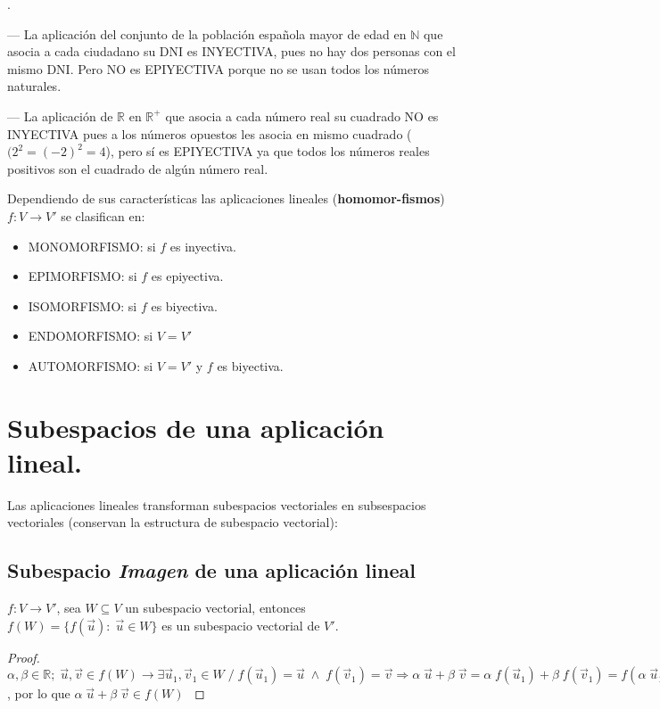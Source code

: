 \begin{ejem}.

--- La aplicación del conjunto de la población española mayor de edad en $\mathbb N$ que asocia a cada ciudadano su DNI es INYECTIVA, pues no hay dos personas con el mismo DNI. Pero NO es EPIYECTIVA	porque no se usan todos los números naturales.

--- La aplicación de $\mathbb R$ en $\mathbb R^+$ que asocia a cada número real su cuadrado NO es INYECTIVA pues a los números opuestos les asocia en mismo cuadrado ($(2^2=(-2)^2=4$), pero sí es EPIYECTIVA ya que todos los números reales positivos son el cuadrado de algún número real.
\end{ejem}

\justify

Dependiendo de sus características las aplicaciones lineales (\textbf{homomor-fismos}) $f:V\to V'$ se clasifican en:

\begin{itemize}
\item MONOMORFISMO: si $f$ es inyectiva.
\item EPIMORFISMO: si $f$ es epiyectiva.
\item ISOMORFISMO: si $f$ es biyectiva.
\item ENDOMORFISMO: si $V=V'$
\item AUTOMORFISMO: si $V=V'$ y $f$ es biyectiva.
\end{itemize}

\section{Subespacios de una aplicación lineal.}

Las aplicaciones lineales transforman subespacios vectoriales en subsespacios vectoriales (conservan la estructura de subespacio vectorial):

\subsection{Subespacio \emph{Imagen} de una aplicación lineal}

\begin{prop}
$f:V\to V'$, sea $W \subseteq V$ un subespacio vectorial, entonces $f(W)=\{f(\vec u): \; \vec u\in W \}$	 es un subespacio vectorial de $V'$.
\end{prop}
\begin{proof}
\textcolor{gris}{ $\alpha, \beta \in \mathbb R; \; \vec u, \vec v \in f(W) \to \exists \vec u_1, \vec v_1 \in W \; / \; f(\vec u_1)=\vec u\; \wedge \; f(\vec v_1)=\vec v \Rightarrow \alpha\; \vec u + \beta\; \vec v = \alpha\; f(\vec u_1) + \beta\; f(\vec v_1) =f(\alpha\; \vec u_1+\beta \; \vec v_1)$, por lo que $ \alpha\; \vec u + \beta \; \vec v \in f(W)$ }	
\end{proof}

